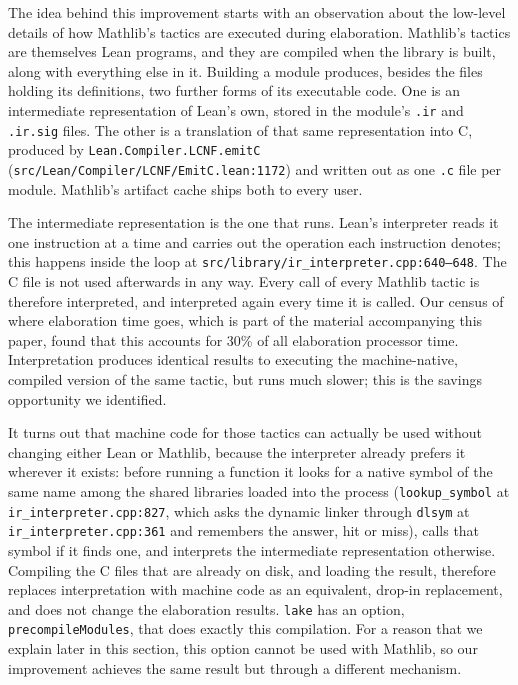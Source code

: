 \documentclass{article}
\newcommand{\Lean}{Lean\xspace}      %
\newcommand{\lake}{\texttt{lake}\xspace}      %
\newcommand{\mathlib}{Mathlib\xspace}
\begin{document}
The idea behind this improvement starts with an observation about the low-level details of how \mathlib's tactics are executed during elaboration.
\mathlib's tactics are themselves \Lean programs, and they are compiled when the library is built, along with everything else in it. Building a module produces, besides the files holding its definitions, two further forms of its executable code. One is an intermediate representation of \Lean's own, stored in the module's \texttt{.ir} and \texttt{.ir.sig} files. The other is a translation of that same representation into C, produced by \texttt{Lean.Compiler.LCNF.emitC} (\texttt{src/Lean/Compiler/LCNF/EmitC.lean:1172}) and written out as one \texttt{.c} file per module. \mathlib's artifact cache ships both to every user.

The intermediate representation is the one that runs. \Lean's interpreter reads it one instruction at a time and carries out the operation each instruction denotes; this happens inside the loop at \texttt{src/library/ir\_interpreter.cpp:640--648}. 
The C file is not used afterwards in any way.
Every call of every \mathlib tactic is therefore interpreted, and interpreted again every time it is called. Our census of where elaboration time goes, which is part of the material accompanying this paper, found that this accounts for 30\% of all elaboration processor time. Interpretation produces identical results to executing the machine-native, compiled version of the same tactic, but runs much slower; this is the savings opportunity we identified.

It turns out that machine code for those tactics can actually be used without changing either \Lean or \mathlib, because the interpreter already prefers it wherever it exists: before running a function it looks for a native symbol of the same name among the shared libraries loaded into the process (\texttt{lookup\_symbol} at \texttt{ir\_interpreter.cpp:827}, which asks the dynamic linker through \texttt{dlsym} at \texttt{ir\_interpreter.cpp:361} and remembers the answer, hit or miss), calls that symbol if it finds one, and interprets the intermediate representation otherwise. Compiling the C files that are already on disk, and loading the result, therefore replaces interpretation with machine code as an equivalent, drop-in replacement, and does not change the elaboration results. \lake has an option, \texttt{precompileModules}, that does exactly this compilation. For a reason that we explain later in this section, this option cannot be used with \mathlib, so our improvement achieves the same result but through a different mechanism.
\end{document}
